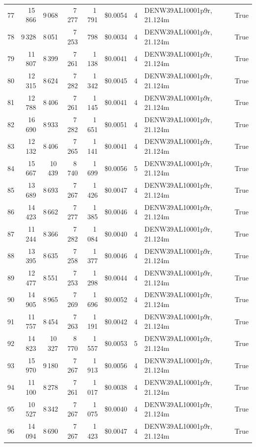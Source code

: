 \documentclass[a4paper,11pt]{article}
\begin{document}
\begin{table}[ht]
\begin{tabular}{r r r r r r r p{3cm} l}
77 & 15\,866 & 9\,068 & 7\,277 & 1\,791 & \$0.0054 & 4 & DENW39AL10001p9r, 21.124m & True \\
78 & 9\,328 & 8\,051 & 7\,253 & 798 & \$0.0034 & 4 & DENW39AL10001p9r, 21.124m & True \\
79 & 11\,807 & 8\,399 & 7\,261 & 1\,138 & \$0.0041 & 4 & DENW39AL10001p9r, 21.124m & True \\
80 & 12\,315 & 8\,624 & 7\,282 & 1\,342 & \$0.0045 & 4 & DENW39AL10001p9r, 21.124m & True \\
81 & 12\,788 & 8\,406 & 7\,261 & 1\,145 & \$0.0041 & 4 & DENW39AL10001p9r, 21.124m & True \\
82 & 16\,690 & 8\,933 & 7\,282 & 1\,651 & \$0.0051 & 4 & DENW39AL10001p9r, 21.124m & True \\
83 & 12\,132 & 8\,406 & 7\,265 & 1\,141 & \$0.0041 & 4 & DENW39AL10001p9r, 21.124m & True \\
84 & 15\,667 & 10\,439 & 8\,740 & 1\,699 & \$0.0056 & 5 & DENW39AL10001p9r, 21.124m & True \\
85 & 13\,689 & 8\,693 & 7\,267 & 1\,426 & \$0.0047 & 4 & DENW39AL10001p9r, 21.124m & True \\
86 & 14\,423 & 8\,662 & 7\,277 & 1\,385 & \$0.0046 & 4 & DENW39AL10001p9r, 21.124m & True \\
87 & 11\,244 & 8\,366 & 7\,282 & 1\,084 & \$0.0040 & 4 & DENW39AL10001p9r, 21.124m & True \\
88 & 13\,395 & 8\,635 & 7\,258 & 1\,377 & \$0.0046 & 4 & DENW39AL10001p9r, 21.124m & True \\
89 & 12\,477 & 8\,551 & 7\,253 & 1\,298 & \$0.0044 & 4 & DENW39AL10001p9r, 21.124m & True \\
90 & 14\,905 & 8\,965 & 7\,269 & 1\,696 & \$0.0052 & 4 & DENW39AL10001p9r, 21.124m & True \\
91 & 11\,757 & 8\,454 & 7\,263 & 1\,191 & \$0.0042 & 4 & DENW39AL10001p9r, 21.124m & True \\
92 & 14\,823 & 10\,327 & 8\,770 & 1\,557 & \$0.0053 & 5 & DENW39AL10001p9r, 21.124m & True \\
93 & 15\,970 & 9\,180 & 7\,267 & 1\,913 & \$0.0056 & 4 & DENW39AL10001p9r, 21.124m & True \\
94 & 11\,100 & 8\,278 & 7\,261 & 1\,017 & \$0.0038 & 4 & DENW39AL10001p9r, 21.124m & True \\
95 & 10\,527 & 8\,342 & 7\,267 & 1\,075 & \$0.0040 & 4 & DENW39AL10001p9r, 21.124m & True \\
96 & 14\,094 & 8\,690 & 7\,267 & 1\,423 & \$0.0047 & 4 & DENW39AL10001p9r, 21.124m & True \\

\end{tabular}
\end{table}
\end{document}
